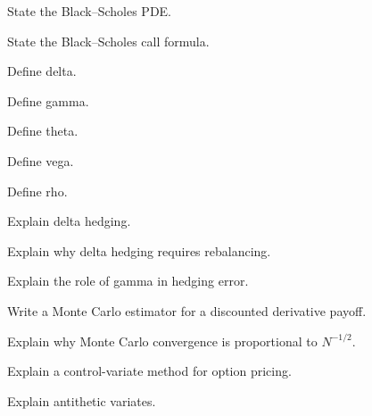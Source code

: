 \begin{exercise}[2]
State the Black--Scholes PDE.
\end{exercise}

\begin{exercise}[2]
State the Black--Scholes call formula.
\end{exercise}

\begin{exercise}[2]
Define delta.
\end{exercise}

\begin{exercise}[2]
Define gamma.
\end{exercise}

\begin{exercise}[2]
Define theta.
\end{exercise}

\begin{exercise}[2]
Define vega.
\end{exercise}

\begin{exercise}[2]
Define rho.
\end{exercise}

\begin{exercise}[3]
Explain delta hedging.
\end{exercise}

\begin{exercise}[3]
Explain why delta hedging requires rebalancing.
\end{exercise}

\begin{exercise}[3]
Explain the role of gamma in hedging error.
\end{exercise}

\begin{exercise}[2]
Write a Monte Carlo estimator for a discounted derivative payoff.
\end{exercise}

\begin{exercise}[3]
Explain why Monte Carlo convergence is proportional to \(N^{-1/2}\).
\end{exercise}

\begin{exercise}[3]
Explain a control-variate method for option pricing.
\end{exercise}

\begin{exercise}[3]
Explain antithetic variates.
\end{exercise}

